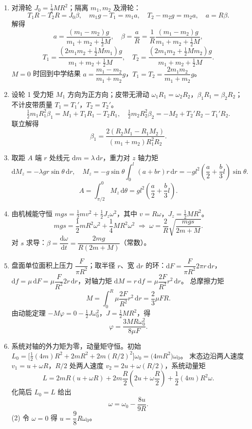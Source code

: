 \documentclass[12pt]{article}
\begin{document}
\begin{enumerate}[label=\textbf{例\arabic*.}, leftmargin=*]
\item 对滑轮 $J_0 = \tfrac{1}{2}MR^2$；隔离 $m_1,m_2$ 及滑轮：
\[
  T_1R - T_2R = J_0\beta,\quad m_1g-T_1=m_1a,\quad T_2-m_2g=m_2a,\quad a=R\beta.
\]
解得
\[
  a = \frac{(m_1-m_2)g}{m_1+m_2+\tfrac{1}{2}M},\quad
  \beta = \frac{a}{R} = \frac{1}{R}\frac{(m_1-m_2)g}{m_1+m_2+\tfrac{1}{2}M},
\]
\[
  T_1 = \frac{(2m_1m_2+\tfrac{1}{2}Mm_1)g}{m_1+m_2+\tfrac{1}{2}M},\quad
  T_2 = \frac{(2m_1m_2+\tfrac{1}{2}Mm_2)g}{m_1+m_2+\tfrac{1}{2}M}.
\]
$M=0$ 时回到中学结果 $a=\dfrac{m_1-m_2}{m_1+m_2}g$，$T_1=T_2=\dfrac{2m_1m_2}{m_1+m_2}g$。

\item 设轮 1 受力矩 $M_1$ 方向为正方向；皮带无滑动 $\omega_1R_1=\omega_2R_2$，$\beta_1R_1=\beta_2R_2$；不计皮带质量 $T_1=T_1'$，$T_2=T_2'$。
\[
  \tfrac{1}{2}m_1R_1^2\beta_1 = M_1 + T_1R_1 - T_2R_1,\quad
  \tfrac{1}{2}m_2R_2^2\beta_2 = -M_2 + T_2'R_2 - T_1'R_2.
\]
联立解得
\[
  \beta_1 = \frac{2(R_2M_1 - R_1M_2)}{(m_1+m_2)R_1^2R_2}.
\]

\item 取距 $A$ 端 $r$ 处线元 $\mathrm{d}m=\lambda\,\mathrm{d}r$，重力对 $z$ 轴力矩
\[
  \mathrm{d}M_z = -\lambda g r\sin\theta\,\mathrm{d}r,\quad
  M_z = -g\sin\theta\!\int_0^l\!(a+br)r\,\mathrm{d}r = -gl^2\!\left(\frac{a}{2}+\frac{b}{3}l\right)\sin\theta.
\]
\[
  A = \int_{\pi/2}^{0} M_z\,\mathrm{d}\theta = gl^2\!\left(\frac{a}{2}+\frac{b}{3}l\right).
\]

\item 由机械能守恒 $mgs = \tfrac{1}{2}mv^2+\tfrac{1}{2}J_z\omega^2$，其中 $v=R\omega$，$J_z=\tfrac{1}{2}MR^2$。
\[
  mgs = \frac{1}{2}mR^2\omega^2 + \frac{1}{4}MR^2\omega^2
  \;\Rightarrow\; \omega = \frac{2}{R}\sqrt{\frac{mgs}{2m+M}}.
\]
对 $s$ 求导：$\beta = \dfrac{\mathrm{d}\omega}{\mathrm{d}t} = \dfrac{2mg}{R(2m+M)}$（常数）。

\item 盘面单位面积上压力 $\dfrac{F}{\pi R^2}$；取半径 $r$、宽 $\mathrm{d}r$ 的环：$\mathrm{d}F = \dfrac{F}{\pi R^2}2\pi r\,\mathrm{d}r$，
$\mathrm{d}f = \mu\,\mathrm{d}F = \mu\dfrac{F}{R^2}2r\,\mathrm{d}r$，对轴力矩 $\mathrm{d}M = r\,\mathrm{d}f = \mu\dfrac{2F}{R^2}r^2\,\mathrm{d}r$。
总摩擦力矩
\[
  M = \int_0^R \mu\frac{2F}{R^2}r^2\,\mathrm{d}r = \frac{2}{3}\mu F R.
\]
由动能定理 $-M\varphi = 0 - \tfrac{1}{2}J\omega_0^2$，$J=\tfrac{1}{2}MR^2$，得
\[
  \varphi = \frac{3MR\omega_0^2}{8\mu F}.
\]

\item 系统对轴的外力矩为零，动量矩守恒。初始 $L_0 = \bigl[\tfrac{1}{2}(4m)R^2+2mR^2+2m(R/2)^2\bigr]\omega_0 = \bigl(4mR^2\bigr)\omega_0$。
末态边沿两人速度 $v_1 = u+\omega R$，$R/2$ 处两人速度 $v_2 = 2u+\omega(R/2)$，系统动量矩
\[
  L = 2mR(u+\omega R) + 2m\frac{R}{2}\!\left(2u+\omega\frac{R}{2}\right) + \frac{1}{2}(4m)R^2\omega.
\]
化简后 $L_0 = L$ 给出
\[
  \omega = \omega_0 - \frac{8u}{9R}.
\]
(2) 令 $\omega=0$ 得 $u = \dfrac{9}{8}R\omega_0$。


\end{enumerate}
\end{document}
